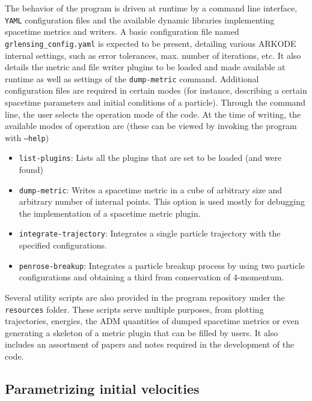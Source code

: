 The behavior of the program is driven at runtime by a command line interface, \texttt{YAML} configuration files and the available dynamic libraries implementing spacetime metrics and writers. A basic configuration file named \texttt{grlensing\_config.yaml} is expected to be present, detailing various ARKODE internal settings, such as error tolerances, max. number of iterations, etc. It also details the metric and file writer plugins to be loaded and made available at runtime as well as settings of the \texttt{dump-metric} command. Additional configuration files are required in certain modes (for instance, describing a certain spacetime parameters and initial conditions of a particle). Through the command line, the user selects the operation mode of the code. At the time of writing, the available modes of operation are (these can be viewed by invoking the program with \texttt{--help})
%
\begin{itemize}
  \item \texttt{list-plugins}: Lists all the plugins that are set to be loaded (and were found)
  \item \texttt{dump-metric}: Writes a spacetime metric in a cube of arbitrary size and arbitrary number of internal points. This option is used mostly for debugging the implementation of a spacetime metric plugin.
  \item \texttt{integrate-trajectory}: Integrates a single particle trajectory with the specified configurations.
  \item \texttt{penrose-breakup}: Integrates a particle breakup process by using two particle configurations and obtaining a third from conservation of 4-momentum.
\end{itemize}
%
Several utility scripts are also provided in the program repository under the \texttt{resources} folder. These scripts serve multiple purposes, from plotting trajectories, energies, the ADM quantities of dumped spacetime metrics or even generating a skeleton of a metric plugin that can be filled by users. It also includes an assortment of papers and notes required in the development of the code.

\subsection{Parametrizing initial velocities}


